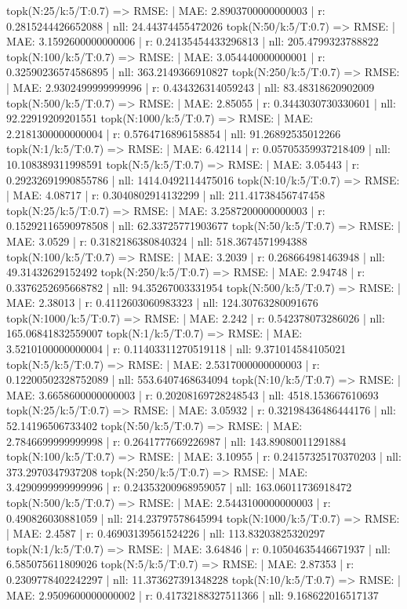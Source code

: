 topk(N:25/k:5/T:0.7) => RMSE: | MAE: 2.8903700000000003 | r: 0.2815244426652088 | nll: 24.44374455472026
topk(N:50/k:5/T:0.7) => RMSE: | MAE: 3.1592600000000006 | r: 0.24135454433296813 | nll: 205.4799323788822
topk(N:100/k:5/T:0.7) => RMSE: | MAE: 3.054440000000001 | r: 0.32590236574586895 | nll: 363.2149366910827
topk(N:250/k:5/T:0.7) => RMSE: | MAE: 2.9302499999999996 | r: 0.434326314059243 | nll: 83.48318620902009
topk(N:500/k:5/T:0.7) => RMSE: | MAE: 2.85055 | r: 0.3443030730330601 | nll: 92.22919209201551
topk(N:1000/k:5/T:0.7) => RMSE: | MAE: 2.2181300000000004 | r: 0.5764716896158854 | nll: 91.26892535012266
topk(N:1/k:5/T:0.7) => RMSE: | MAE: 6.42114 | r: 0.05705359937218409 | nll: 10.108389311998591
topk(N:5/k:5/T:0.7) => RMSE: | MAE: 3.05443 | r: 0.29232691990855786 | nll: 1414.0492114475016
topk(N:10/k:5/T:0.7) => RMSE: | MAE: 4.08717 | r: 0.3040802914132299 | nll: 211.41738456747458
topk(N:25/k:5/T:0.7) => RMSE: | MAE: 3.2587200000000003 | r: 0.15292116590978508 | nll: 62.33725771903677
topk(N:50/k:5/T:0.7) => RMSE: | MAE: 3.0529 | r: 0.3182186380840324 | nll: 518.3674571994388
topk(N:100/k:5/T:0.7) => RMSE: | MAE: 3.2039 | r: 0.268664981463948 | nll: 49.31432629152492
topk(N:250/k:5/T:0.7) => RMSE: | MAE: 2.94748 | r: 0.3376252695668782 | nll: 94.35267003331954
topk(N:500/k:5/T:0.7) => RMSE: | MAE: 2.38013 | r: 0.4112603060983323 | nll: 124.30763280091676
topk(N:1000/k:5/T:0.7) => RMSE: | MAE: 2.242 | r: 0.542378073286026 | nll: 165.06841832559007
topk(N:1/k:5/T:0.7) => RMSE: | MAE: 3.5210100000000004 | r: 0.11403311270519118 | nll: 9.371014584105021
topk(N:5/k:5/T:0.7) => RMSE: | MAE: 2.5317000000000003 | r: 0.12200502328752089 | nll: 553.6407468634094
topk(N:10/k:5/T:0.7) => RMSE: | MAE: 3.6658600000000003 | r: 0.20208169728248543 | nll: 4518.153667610693
topk(N:25/k:5/T:0.7) => RMSE: | MAE: 3.05932 | r: 0.32198436486444176 | nll: 52.14196506733402
topk(N:50/k:5/T:0.7) => RMSE: | MAE: 2.7846699999999998 | r: 0.2641777669226987 | nll: 143.89080011291884
topk(N:100/k:5/T:0.7) => RMSE: | MAE: 3.10955 | r: 0.24157325170370203 | nll: 373.2970347937208
topk(N:250/k:5/T:0.7) => RMSE: | MAE: 3.4290999999999996 | r: 0.24353200968959057 | nll: 163.06011736918472
topk(N:500/k:5/T:0.7) => RMSE: | MAE: 2.5443100000000003 | r: 0.490826030881059 | nll: 214.23797578645994
topk(N:1000/k:5/T:0.7) => RMSE: | MAE: 2.4587 | r: 0.46903139561524226 | nll: 113.83203825320297
topk(N:1/k:5/T:0.7) => RMSE: | MAE: 3.64846 | r: 0.10504635446671937 | nll: 6.585075611809026
topk(N:5/k:5/T:0.7) => RMSE: | MAE: 2.87353 | r: 0.2309778402242297 | nll: 11.373627391348228
topk(N:10/k:5/T:0.7) => RMSE: | MAE: 2.9509600000000002 | r: 0.41732188327511366 | nll: 9.168622016517137
